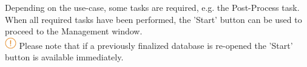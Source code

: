 Depending on the use-case, some tasks are required, e.g. the Post-Process task. When all required tasks have been performed, the 'Start' button can be used to proceed to the Management window. \\

\includegraphics[width=0.5cm]{../../data/icons/hint.png} Please note that if a previously finalized database is re-opened the 'Start' button is available immediately.





















